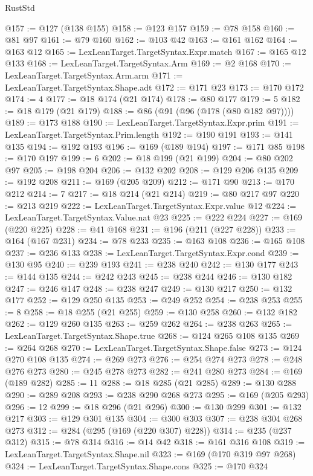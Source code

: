 \begin{lexlean}{RustStd}
\begin{coremodule}
@157 := @127 (@138 @155)
@158 := @123 @157
@159 := @78 @158
@160 := @81 @97
@161 := @79 @160
@162 := @103 @42
@163 := @161 @162
@164 := @163 @12
@165 := LexLeanTarget.TargetSyntax.Expr.match
@167 := @165 @12 @133
@168 := LexLeanTarget.TargetSyntax.Arm
@169 := @2 @168
@170 := LexLeanTarget.TargetSyntax.Arm.arm
@171 := LexLeanTarget.TargetSyntax.Shape.adt
@172 := @171 @23
@173 := @170 @172
@174 := 4
@177 := @18 @174 (@21 @174)
@178 := @80 @177
@179 := 5
@182 := @18 @179 (@21 @179)
@188 := @86 (@91 (@96 (@178 (@80 @182 @97))))
@189 := @173 @188
@190 := LexLeanTarget.TargetSyntax.Expr.prim
@191 := LexLeanTarget.TargetSyntax.Prim.length
@192 := @190 @191
@193 := @141 @135
@194 := @192 @193
@196 := @169 (@189 @194)
@197 := @171 @85
@198 := @170 @197
@199 := 6
@202 := @18 @199 (@21 @199)
@204 := @80 @202 @97
@205 := @198 @204
@206 := @132 @202
@208 := @129 @206 @135
@209 := @192 @208
@211 := @169 (@205 @209)
@212 := @171 @90
@213 := @170 @212
@214 := 7
@217 := @18 @214 (@21 @214)
@219 := @80 @217 @97
@220 := @213 @219
@222 := LexLeanTarget.TargetSyntax.Expr.value @12
@224 := LexLeanTarget.TargetSyntax.Value.nat @23
@225 := @222 @224
@227 := @169 (@220 @225)
@228 := @41 @168
@231 := @196 (@211 (@227 @228))
@233 := @164 (@167 @231)
@234 := @78 @233
@235 := @163 @108
@236 := @165 @108
@237 := @236 @133
@238 := LexLeanTarget.TargetSyntax.Expr.cond
@239 := @130 @95
@240 := @239 @193
@241 := @238 @240
@242 := @130 @177
@243 := @144 @135
@244 := @242 @243
@245 := @238 @244
@246 := @130 @182
@247 := @246 @147
@248 := @238 @247
@249 := @130 @217
@250 := @132 @177
@252 := @129 @250 @135
@253 := @249 @252
@254 := @238 @253
@255 := 8
@258 := @18 @255 (@21 @255)
@259 := @130 @258
@260 := @132 @182
@262 := @129 @260 @135
@263 := @259 @262
@264 := @238 @263
@265 := LexLeanTarget.TargetSyntax.Shape.true
@268 := @124 @265 @108 @135
@269 := @264 @268
@270 := LexLeanTarget.TargetSyntax.Shape.false
@273 := @124 @270 @108 @135
@274 := @269 @273
@276 := @254 @274 @273
@278 := @248 @276 @273
@280 := @245 @278 @273
@282 := @241 @280 @273
@284 := @169 (@189 @282)
@285 := 11
@288 := @18 @285 (@21 @285)
@289 := @130 @288
@290 := @289 @208
@293 := @238 @290 @268 @273
@295 := @169 (@205 @293)
@296 := 12
@299 := @18 @296 (@21 @296)
@300 := @130 @299
@301 := @132 @217
@303 := @129 @301 @135
@304 := @300 @303
@307 := @238 @304 @268 @273
@312 := @284 (@295 (@169 (@220 @307) @228))
@314 := @235 (@237 @312)
@315 := @78 @314
@316 := @14 @42
@318 := @161 @316 @108
@319 := LexLeanTarget.TargetSyntax.Shape.nil
@323 := @169 (@170 @319 @97 @268)
@324 := LexLeanTarget.TargetSyntax.Shape.cons
@325 := @170 @324

\end{coremodule}
\end{lexlean}
